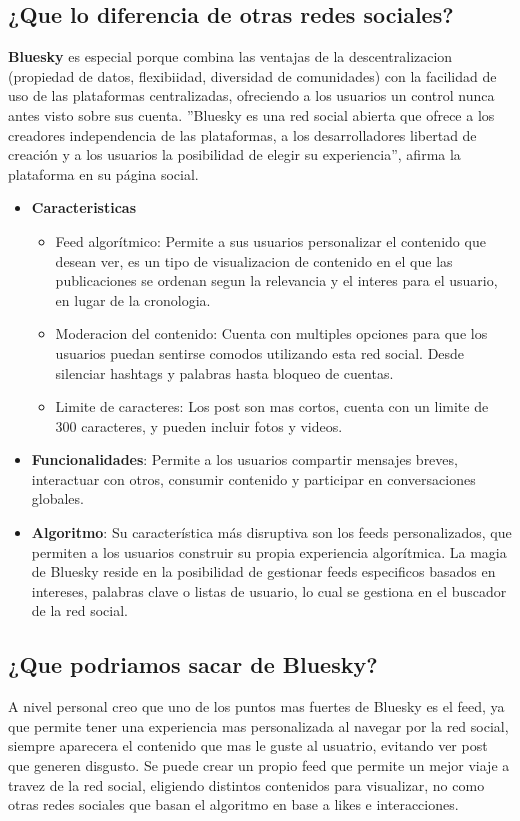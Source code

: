 \subsection*{¿Que lo diferencia de otras redes sociales?}
\textbf{Bluesky} es especial porque combina las ventajas de la descentralizacion (propiedad de datos, flexibiidad, diversidad de comunidades)
con la facilidad de uso de las plataformas centralizadas, ofreciendo a los usuarios un control nunca antes visto sobre sus cuenta.
''Bluesky es una red social abierta que ofrece a los creadores independencia de las plataformas, a los desarrolladores libertad de creación y a los usuarios la posibilidad de elegir su experiencia'', afirma la plataforma en su página social.
\begin{itemize}
    \item \textbf{Caracteristicas}
    \begin{itemize}
        \item Feed algorítmico:
        Permite a sus usuarios personalizar el contenido que desean ver, es un tipo de visualizacion de contenido en el que las publicaciones se ordenan segun la relevancia y el interes para el usuario, en lugar de la cronologia.
        \item Moderacion del contenido:
        Cuenta con multiples opciones para que los usuarios puedan sentirse comodos utilizando esta red social. Desde silenciar hashtags y palabras hasta bloqueo de cuentas.
        \item Limite de caracteres:
        Los post son mas cortos, cuenta con un limite de 300 caracteres, y pueden incluir fotos y videos.
    \end{itemize}    
    \item \textbf{Funcionalidades}:
        Permite a los usuarios compartir mensajes breves, interactuar con otros, consumir contenido y participar en conversaciones globales.
    \item \textbf{Algoritmo}:
        Su característica más disruptiva son los feeds personalizados, que permiten a los usuarios construir su propia experiencia algorítmica.
        La magia de Bluesky reside en la posibilidad de gestionar feeds especificos basados en intereses, palabras clave o listas de usuario, lo cual se gestiona en el buscador de la red social.
\end{itemize}
\subsection*{¿Que podriamos sacar de Bluesky?}
A nivel personal creo que uno de los puntos mas fuertes de Bluesky es el feed, ya que permite tener una experiencia mas personalizada al navegar por la red social,
siempre aparecera el contenido que mas le guste al usuatrio, evitando ver post que generen disgusto.
Se puede crear un propio feed que permite un mejor viaje a travez de la red social, eligiendo distintos contenidos para visualizar, no como otras redes sociales que basan el algoritmo en base a likes e interacciones. 

